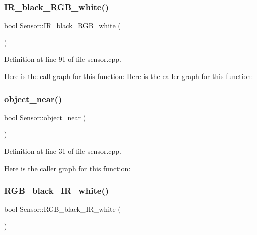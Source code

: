 \mbox{\label{class_sensor_a03b8f6886c672badadfeef89d069e1ea}} 
\subsubsection{\texorpdfstring{I\+R\+\_\+black\+\_\+\+R\+G\+B\+\_\+white()}{IR\_black\_RGB\_white()}}
{\footnotesize\ttfamily bool Sensor\+::\+I\+R\+\_\+black\+\_\+\+R\+G\+B\+\_\+white (\begin{DoxyParamCaption}{ }\end{DoxyParamCaption})}



Definition at line 91 of file sensor.\+cpp.

Here is the call graph for this function\+:
Here is the caller graph for this function\+:
\mbox{\label{class_sensor_a4f797e3f6a549cfdefab639eb6a86787}} 
\subsubsection{\texorpdfstring{object\+\_\+near()}{object\_near()}}
{\footnotesize\ttfamily bool Sensor\+::object\+\_\+near (\begin{DoxyParamCaption}{ }\end{DoxyParamCaption})}



Definition at line 31 of file sensor.\+cpp.

Here is the caller graph for this function\+:
\mbox{\label{class_sensor_aa75ec0ed5bd2782f726f7e01796b2285}} 
\subsubsection{\texorpdfstring{R\+G\+B\+\_\+black\+\_\+\+I\+R\+\_\+white()}{RGB\_black\_IR\_white()}}
{\footnotesize\ttfamily bool Sensor\+::\+R\+G\+B\+\_\+black\+\_\+\+I\+R\+\_\+white (\begin{DoxyParamCaption}{ }\end{DoxyParamCaption})}



